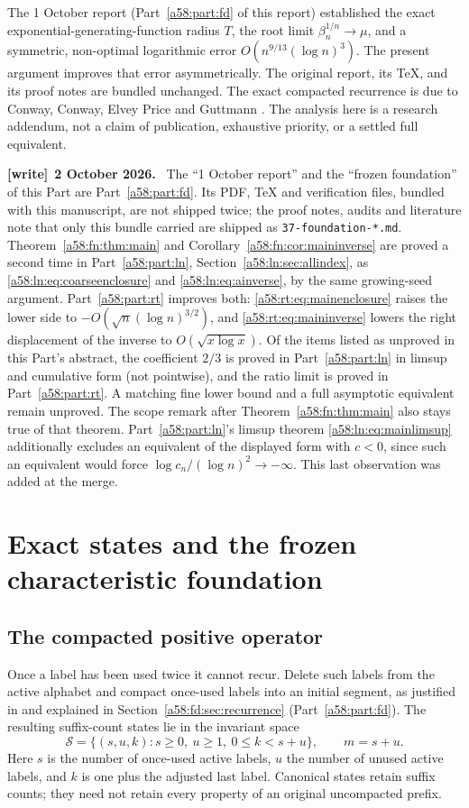 \documentclass[11pt,letterpaper]{article}
\newcommand{\file}[1]{\nolinkurl{#1}}
\theoremstyle{remark}
\newcommand{\calS}{\mathcal S}
\newenvironment{writenote}[1][]{\par\smallskip\begingroup\small
 \noindent\textbf{[write]}\if\relax\detokenize{#1}\relax\else~\textbf{#1.}\fi\ }%
 {\par\endgroup\smallskip}
\begin{document}
The 1 October report (Part~\ref{a58:part:fd} of this report) established the exact exponential-generating-function radius $T$, the root limit $\beta_n^{1/n}\to\mu$, and a symmetric, non-optimal logarithmic error $O(n^{9/13}(\log n)^3)$. The present argument improves that error asymmetrically. The original report, its TeX, and its proof notes are bundled unchanged. The exact compacted recurrence is due to Conway, Conway, Elvey Price and Guttmann \cite{CCEG}. The analysis here is a research addendum, not a claim of publication, exhaustive priority, or a settled full equivalent.
\begin{writenote}[2 October 2026]
The ``1 October report'' and the ``frozen foundation'' of this Part are Part~\ref{a58:part:fd}. Its PDF, TeX and verification files, bundled with this manuscript, are not shipped twice; the proof notes, audits and literature note that only this bundle carried are shipped as \file{37-foundation-*.md}. Theorem~\ref{a58:fn:thm:main} and Corollary~\ref{a58:fn:cor:maininverse} are proved a second time in Part~\ref{a58:part:ln}, Section~\ref{a58:ln:sec:allindex}, as \eqref{a58:ln:eq:coarseenclosure} and \eqref{a58:ln:eq:ainverse}, by the same growing-seed argument. Part~\ref{a58:part:rt} improves both: \eqref{a58:rt:eq:mainenclosure} raises the lower side to $-O(\sqrt n(\log n)^{3/2})$, and \eqref{a58:rt:eq:maininverse} lowers the right displacement of the inverse to $O(\sqrt{x\log x})$. Of the items listed as unproved in this Part's abstract, the coefficient $2/3$ is proved in Part~\ref{a58:part:ln} in limsup and cumulative form (not pointwise), and the ratio limit is proved in Part~\ref{a58:part:rt}. A matching fine lower bound and a full asymptotic equivalent remain unproved. The scope remark after Theorem~\ref{a58:fn:thm:main} also stays true of that theorem. Part~\ref{a58:part:ln}'s limsup theorem \eqref{a58:ln:eq:mainlimsup} additionally excludes an equivalent of the displayed form with $c<0$, since such an equivalent would force $\log c_n/(\log n)^2\to-\infty$. This last observation was added at the merge.
\end{writenote}

\section{Exact states and the frozen characteristic foundation}\label{a58:fn:sec:foundation}
\subsection{The compacted positive operator}
Once a label has been used twice it cannot recur. Delete such labels from the active alphabet and compact once-used labels into an initial segment, as justified in \cite[Sections 2.2 and 2.6]{CCEG} and explained in Section~\ref{a58:fd:sec:recurrence} (Part~\ref{a58:part:fd}). The resulting suffix-count states lie in the invariant space
\[
 \calS=\{(s,u,k):s\ge0,\ u\ge1,\ 0\le k<s+u\},\qquad m=s+u.
\]
Here $s$ is the number of once-used active labels, $u$ the number of unused active labels, and $k$ is one plus the adjusted last label. Canonical states retain suffix counts; they need not retain every property of an original uncompacted prefix.
\end{document}

